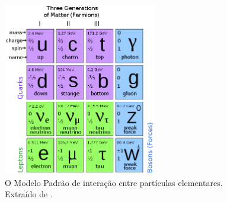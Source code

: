 \begin{figure}[h!t]
\centering
\includegraphics[width=0.6\textwidth]{imagens/standart_model.png}
\caption{O Modelo Padrão de interação entre partículas elementares. Extraído de
\cite{tese_torres}.}
\label{fig:modelo_padrao}
\end{figure}


